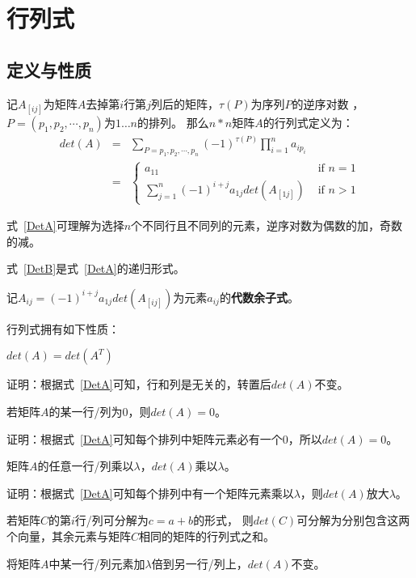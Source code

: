 \section{行列式}
\subsection{定义与性质}
记$A_{[ij]}$为矩阵$A$去掉第$i$行第$j$列后的矩阵，$\tau(P)$为序列$P$的逆序对数
，$P=(p_1,p_2,\cdots,p_n)$为$1\ldots n$的排列。
那么$n*n$矩阵$A$的行列式定义为：
\begin{eqnarray}
	det(A)&=&\sum_{P={p_1,p_2,\cdots,p_n}}
	{(-1)^{\tau(P)}\prod_{i=1}^n{a_{ip_i}}}\label{DetA}\\
	&=&\left\{
	\begin{array}{ll}
		a_{11}                                                    & \textrm{~if~$n=1$} \\
		\displaystyle \sum_{j=1}^n{(-1)^{i+j}a_{1j}det(A_{[1j]})} & \textrm{~if~$n>1$}
	\end{array}
	\right.\label{DetB}
\end{eqnarray}

式~\ref{DetA}可理解为选择$n$个不同行且不同列的元素，逆序对数为偶数的加，奇数的减。

式~\ref{DetB}是式~\ref{DetA}的递归形式。

记$A_{ij}=(-1)^{i+j}a_{1j}det(A_{[ij]})$为元素$a_{ij}$的{\bfseries 代数余子式}。

行列式拥有如下性质：
\begin{property}
	$det(A)=det(A^T)$
\end{property}

证明：根据式~\ref{DetA}可知，行和列是无关的，转置后$det(A)$不变。
\begin{property}
	若矩阵$A$的某一行/列为0，则$det(A)=0$。
\end{property}

证明：根据式~\ref{DetA}可知每个排列中矩阵元素必有一个0，所以$det(A)=0$。
\begin{property}
	矩阵$A$的任意一行/列乘以$\lambda$，$det(A)$乘以$\lambda$。
\end{property}

证明：根据式~\ref{DetA}可知每个排列中有一个矩阵元素乘以$\lambda$，则$det(A)$放大$\lambda$。
\begin{property}
    若矩阵$C$的第$i$行/列可分解为$c=a+b$的形式，
    则$det(C)$可分解为分别包含这两个向量，其余元素与矩阵$C$相同的矩阵的行列式之和。
\end{property}
\begin{inference}
	将矩阵$A$中某一行/列元素加$\lambda$倍到另一行/列上，$det(A)$不变。
\end{inference}

